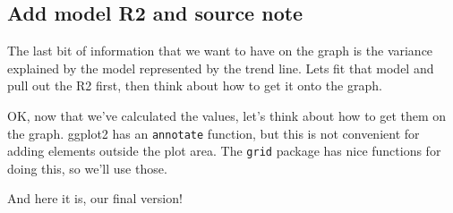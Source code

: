 \documentclass[]{book}
\newenvironment{Shaded}{\begin{snugshade}}{\end{snugshade}}
\newcommand{\KeywordTok}[1]{\textcolor[rgb]{0.13,0.29,0.53}{\textbf{#1}}}
\newcommand{\DataTypeTok}[1]{\textcolor[rgb]{0.13,0.29,0.53}{#1}}
\newcommand{\DecValTok}[1]{\textcolor[rgb]{0.00,0.00,0.81}{#1}}
\newcommand{\StringTok}[1]{\textcolor[rgb]{0.31,0.60,0.02}{#1}}
\newcommand{\OperatorTok}[1]{\textcolor[rgb]{0.81,0.36,0.00}{\textbf{#1}}}
\newcommand{\NormalTok}[1]{#1}
\begin{document}
\subsection{Add model R2 and source
note}\label{add-model-r2-and-source-note}

The last bit of information that we want to have on the graph is the
variance explained by the model represented by the trend line. Lets fit
that model and pull out the R2 first, then think about how to get it
onto the graph.

\begin{Shaded}
\end{Shaded}

OK, now that we've calculated the values, let's think about how to get
them on the graph. ggplot2 has an \texttt{annotate} function, but this
is not convenient for adding elements outside the plot area. The
\texttt{grid} package has nice functions for doing this, so we'll use
those.

And here it is, our final version!
\end{document}
